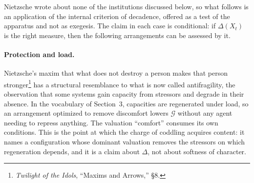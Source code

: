 \documentclass[11pt]{article}
\theoremstyle{definition}
\begin{document}
Nietzsche wrote about none of the institutions discussed below, so what follows is an application of the internal criterion of decadence, offered as a test of the apparatus and not as exegesis. The claim in each case is conditional: if $\Delta(X_t)$ is the right measure, then the following arrangements can be assessed by it.

\paragraph{Protection and load.} Nietzsche's maxim that what does not destroy a person makes that person stronger\footnote{\emph{Twilight of the Idols}, ``Maxims and Arrows,'' \S8.} has a structural resemblance to what is now called antifragility, the observation that some systems gain capacity from stressors and degrade in their absence. In the vocabulary of Section~3, capacities are regenerated under load, so an arrangement optimized to remove discomfort lowers $\mathcal{G}$ without any agent needing to repress anything. The valuation ``comfort'' consumes its own conditions. This is the point at which the charge of coddling acquires content: it names a configuration whose dominant valuation removes the stressors on which regeneration depends, and it is a claim about $\Delta$, not about softness of character.
\end{document}
